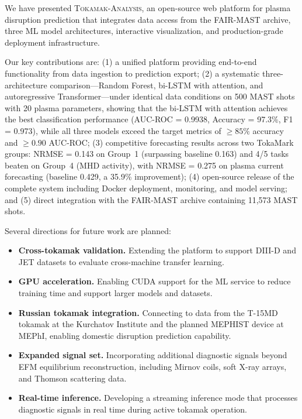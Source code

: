 \documentclass[twocolumn]{article}
\begin{document}
We have presented \textsc{Tokamak-Analysis}, an open-source
web platform for plasma disruption prediction that integrates
data access from the FAIR-MAST archive, three ML model
architectures, interactive visualization, and production-grade
deployment infrastructure.

Our key contributions are:
(1) a unified platform providing end-to-end functionality
from data ingestion to prediction export;
(2) a systematic three-architecture comparison---Random Forest,
bi-LSTM with attention, and autoregressive Transformer---under
identical data conditions on 500 MAST shots with 20 plasma
parameters, showing that the bi-LSTM with attention achieves
the best classification performance
(AUC-ROC = 0.9938, Accuracy = 97.3\%, F1 = 0.973),
while all three models exceed the target metrics of
$\geq 85\%$ accuracy and $\geq 0.90$ AUC-ROC;
(3) competitive forecasting results across two TokaMark groups:
NRMSE = 0.143 on Group~1 (surpassing baseline 0.163) and
4/5 tasks beaten on Group~4 (MHD activity), with NRMSE = 0.275
on plasma current forecasting (baseline 0.429, a 35.9\% improvement);
(4) open-source release of the complete system including
Docker deployment, monitoring, and model serving;
and (5) direct integration with the FAIR-MAST archive
containing 11{,}573 MAST shots.

Several directions for future work are planned:
\begin{itemize}[noitemsep]
  \item \textbf{Cross-tokamak validation.} Extending the
    platform to support DIII-D and JET datasets to evaluate
    cross-machine transfer learning.
  \item \textbf{GPU acceleration.} Enabling CUDA support for
    the ML service to reduce training time and support larger
    models and datasets.
  \item \textbf{Russian tokamak integration.} Connecting to
    data from the T-15MD tokamak at the Kurchatov Institute
    and the planned MEPHIST device at MEPhI, enabling
    domestic disruption prediction capability.
  \item \textbf{Expanded signal set.} Incorporating additional
    diagnostic signals beyond EFM equilibrium reconstruction,
    including Mirnov coils, soft X-ray arrays, and Thomson
    scattering data.
  \item \textbf{Real-time inference.} Developing a streaming
    inference mode that processes diagnostic signals in real time
    during active tokamak operation.
\end{itemize}
\end{document}
